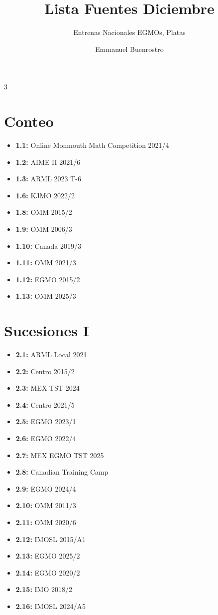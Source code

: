 \documentclass[11pt]{scrartcl}
\title {Lista Fuentes Diciembre }
\subtitle{Entrenas Nacionales EGMOs, Platas}
\author{Emmanuel Buenrostro}
\begin{document}
\maketitle
\begin{multicols}{3}
\section{Conteo}
\begin{itemize}
    \item \textbf{1.1: } Online Monmouth Math Competition 2021/4
    \item \textbf{1.2: } AIME II 2021/6
    \item \textbf{1.3: } ARML 2023 T-6
    \item \textbf{1.6: } KJMO 2022/2
    \item \textbf{1.8: } OMM 2015/2
    \item \textbf{1.9: } OMM 2006/3
    \item \textbf{1.10: } Canada 2019/3
    \item \textbf{1.11: } OMM 2021/3
    \item \textbf{1.12: } EGMO 2015/2
    \item \textbf{1.13: } OMM 2025/3
\end{itemize}
\columnbreak
\section{Sucesiones I}
\begin{itemize}
    \item \textbf{2.1: } ARML Local 2021
    \item \textbf{2.2: } Centro 2015/2
    \item \textbf{2.3: } MEX TST 2024
    \item \textbf{2.4:} Centro 2021/5
    \item \textbf{2.5: } EGMO 2023/1
    \item \textbf{2.6: } EGMO 2022/4
    \item \textbf{2.7: } MEX EGMO TST 2025
    \item \textbf{2.8: } Canadian Training Camp
    \item \textbf{2.9: } EGMO 2024/4
    \item \textbf{2.10: } OMM 2011/3
    \item \textbf{2.11: } OMM 2020/6
    \item \textbf{2.12: } IMOSL 2015/A1 
    \item \textbf{2.13: } EGMO 2025/2
    \item \textbf{2.14: } EGMO 2020/2
    \item \textbf{2.15: } IMO 2018/2
    \item \textbf{2.16: } IMOSL 2024/A5
\end{itemize}
\columnbreak

\end{multicols}
\end{document}
